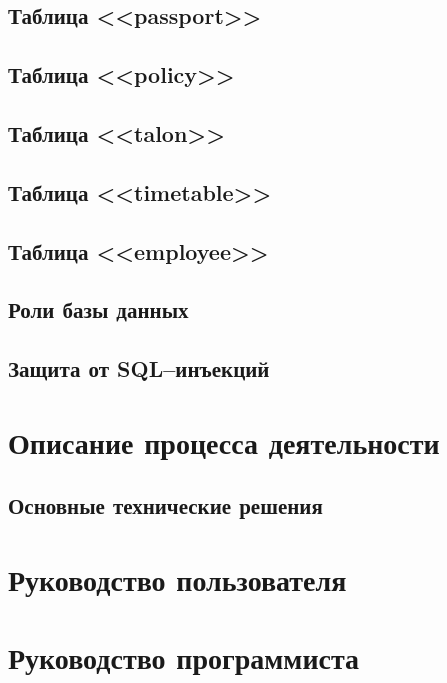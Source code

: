 \subsection{Таблица <<passport>>}

\subsection{Таблица <<policy>>}

\subsection{Таблица <<talon>>}

\subsection{Таблица <<timetable>>}

\subsection{Таблица <<employee>>}

\subsection{Роли базы данных}

\subsection{Защита от SQL–инъекций}


\newpage
\section{Описание процесса деятельности} 
\setcounter{figure}{0}



\subsection{Основные технические решения}


\newpage
\section{Руководство пользователя} 
\setcounter{figure}{0}


\newpage
\section{Руководство программиста} 
\setcounter{figure}{0}



